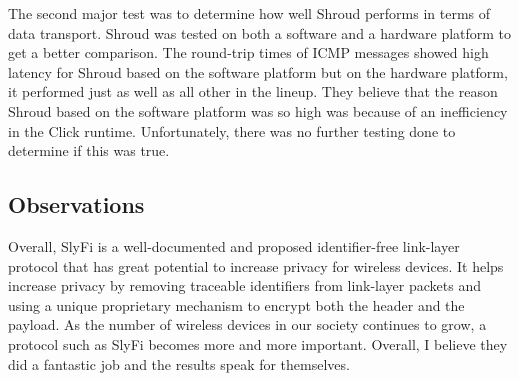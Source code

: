 \smallskip

The second major test was to determine how well Shroud performs in terms of data transport. Shroud was tested on both a software and a hardware platform to get a better comparison. The round-trip times of ICMP messages showed high latency for Shroud based on the software platform but on the hardware platform, it performed just as well as all other in the lineup. They believe that the reason Shroud based on the software platform was so high was because of an inefficiency in the Click runtime. Unfortunately, there was no further testing done to determine if this was true.

\subsection {Observations}
\smallskip

Overall, SlyFi is a well-documented and proposed identifier-free link-layer protocol that has great potential to increase privacy for wireless devices. It helps increase privacy by removing traceable identifiers from link-layer packets and using a unique proprietary mechanism to encrypt both the header and the payload. As the number of wireless devices in our society continues to grow, a protocol such as SlyFi becomes more and more important. Overall, I believe they did a fantastic job and the results speak for themselves.


